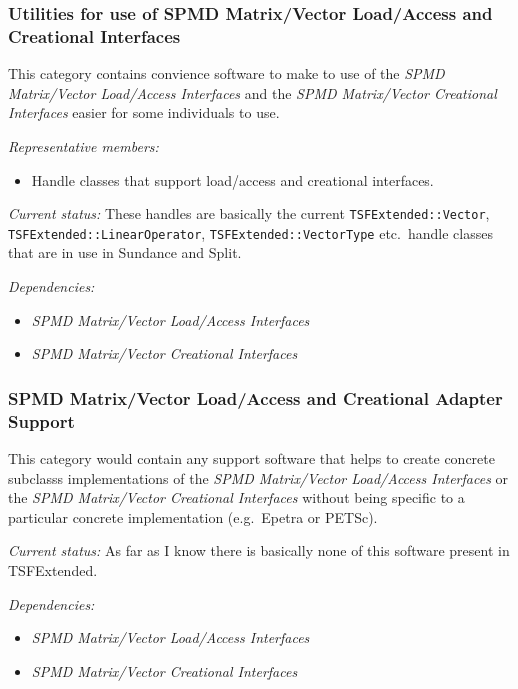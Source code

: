 \documentclass[pdf,ps2pdf,11pt]{SANDreport}
\begin{document}
%
\subsubsection{Utilities for use of SPMD Matrix/Vector Load/Access and Creational Interfaces}
%

This category contains convience software to make to use of the {}\textit{SPMD
Matrix/Vector Load/Access Interfaces} and the {}\textit{SPMD Matrix/Vector
Creational Interfaces} easier for some individuals to use.

{}\textit{Representative members:}
\begin{itemize}
%
{}\item Handle classes that support load/access and creational interfaces.
%
\end{itemize}

{}\textit{Current status:} These handles are basically the current
{}\texttt{TSFExtended\-::Vector}, {}\texttt{TSFExtended\-::LinearOperator},
{}\texttt{TSFExtended\-::VectorType} etc.\ handle classes that are in use in
Sundance and Split.

{}\textit{Dependencies:}
\begin{itemize}
{}\item{}\textit{SPMD Matrix/Vector Load/Access Interfaces}
{}\item{}\textit{SPMD Matrix/Vector Creational Interfaces}
\end{itemize}

%
\subsubsection{SPMD Matrix/Vector Load/Access and Creational Adapter Support}
%

This category would contain any support software that helps to create concrete
subclasss implementations of the {}\textit{SPMD Matrix/Vector Load/Access
Interfaces} or the {}\textit{SPMD Matrix/Vector Creational Interfaces} without
being specific to a particular concrete implementation (e.g.\ Epetra or
PETSc).

{}\textit{Current status:} As far as I know there is basically none of this
software present in TSFExtended.


{}\textit{Dependencies:}
\begin{itemize}
{}\item{}\textit{SPMD Matrix/Vector Load/Access Interfaces}
{}\item{}\textit{SPMD Matrix/Vector Creational Interfaces}
\end{itemize}
\end{document}
